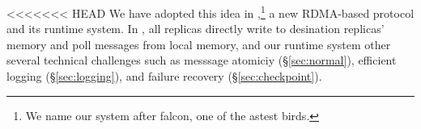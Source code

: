 %
%
%

<<<<<<< HEAD
We have adopted this idea in \xxx,\footnote{We name our system after 
falcon, one of the astest birds.} a new RDMA-based \paxos protocol and its 
runtime system. In \xxx, all replicas directly write to desination 
replicas' memory and poll messages from local memory, and our runtime system 
other several technical challenges such as messsage atomiciy 
(\S\ref{sec:normal}), efficient logging (\S\ref{sec:logging}), and failure 
recovery (\S\ref{sec:checkpoint}).

